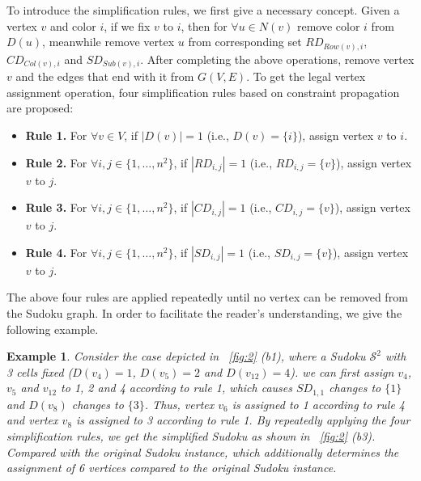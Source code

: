 \documentclass{article}
\newtheorem{example}{Example}
\begin{document}
To introduce the simplification rules, we first give a necessary concept. Given a vertex $v$ and color $i$, if we fix $v$ to $i$, then for $\forall u \in N(v)$ remove color $i$ from $D(u)$, meanwhile remove vertex $u$ from corresponding set $RD_{Row(v), i}$, $CD_{Col(v), i}$ and $SD_{Sub(v), i}$. After completing the above operations, remove vertex $v$ and the edges that end with it from $G(V,E)$. To get the legal vertex assignment operation, four simplification rules based on constraint propagation are proposed:

\begin{itemize}
\renewcommand{\labelenumi}{}
    \item \textbf{Rule 1.} For $\forall v \in V$, if $|D(v)| = 1$ (i.e., $D(v)=\{i\}$), assign vertex $v$ to $i$.
    \item \textbf{Rule 2.} For $\forall i,j \in \{1, \dots , n^2\}$, if $|RD_{i,j}| = 1$ (i.e., $RD_{i,j}=\{v\}$), assign vertex $v$ to $j$.
    \item \textbf{Rule 3.} For $\forall i,j \in \{1, \dots, n^2\}$, if $|CD_{i,j}| = 1$ (i.e., $CD_{i,j}=\{v\}$), assign vertex $v$ to $j$.
    \item \textbf{Rule 4.} For $\forall i,j \in \{1, \dots, n^2\}$, if $|SD_{i,j}| = 1$ (i.e., $SD_{i,j}=\{v\}$), assign vertex $v$ to $j$.
\end{itemize}

    
    
    

The above four rules are applied repeatedly until no vertex can be removed from the Sudoku graph. In order to facilitate the reader's understanding, we give the following example.

\begin{example} \label{ex}
    Consider the case depicted in \figurename~\ref{fig:2} (b1), where a Sudoku $\mathcal{S}^2$ with 3 cells fixed ($D(v_4) = 1$, $D(v_5) = 2$ and $D(v_{12}) = 4$). we can first assign $v_4$, $v_5$ and $v_{12}$ to 1, 2 and 4 according to rule 1, which causes $SD_{1,1}$ changes to $\{1\}$ and $D(v_8)$ changes to $\{3\}$. Thus, vertex $v_6$ is assigned to 1 according to rule 4 and vertex $v_8$ is assigned to 3 according to rule 1. By repeatedly applying the four simplification rules, we get the simplified Sudoku as shown in \figurename~\ref{fig:2} (b3). Compared with the original Sudoku instance, which additionally determines the assignment of 6 vertices compared to the original Sudoku instance.
\end{example}
\end{document}

